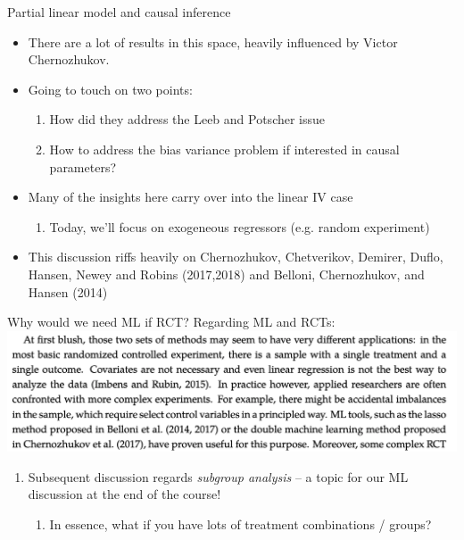   \begin{frame}{Partial linear model and causal inference}
    \begin{itemize}
    \item There are a lot of results in this space, heavily influenced
      by Victor Chernozhukov.
      
    \item  Going to touch on two points:
    \begin{enumerate}
    \item How did they address the Leeb and Potscher issue
    \item How to address the bias variance problem if interested in causal parameters?
    \end{enumerate}
  \item Many of the insights here carry over into the linear IV case
    \begin{enumerate}[-]
    \item Today, we'll focus on exogeneous regressors (e.g. random
      experiment)
    \end{enumerate}
  \item This discussion riffs heavily on Chernozhukov, Chetverikov,
    Demirer, Duflo, Hansen, Newey and Robins (2017,2018) and Belloni,
    Chernozhukov, and Hansen (2014)
    \end{itemize}
  \end{frame}
  
  \begin{frame}{Why would we need ML if RCT?}
    Regarding ML and RCTs:
    \includegraphics[width=\linewidth]{duflo_chernozhukov_ECMA.png}
    
    \begin{enumerate}[-]
    \item   Subsequent discussion regards \emph{subgroup analysis} -- a topic
      for our ML discussion at the end of the course!
      \begin{enumerate}[-]
      \item In essence, what if you have lots of treatment combinations /
        groups?
      \end{enumerate}
    \end{enumerate}
  \end{frame}
  
